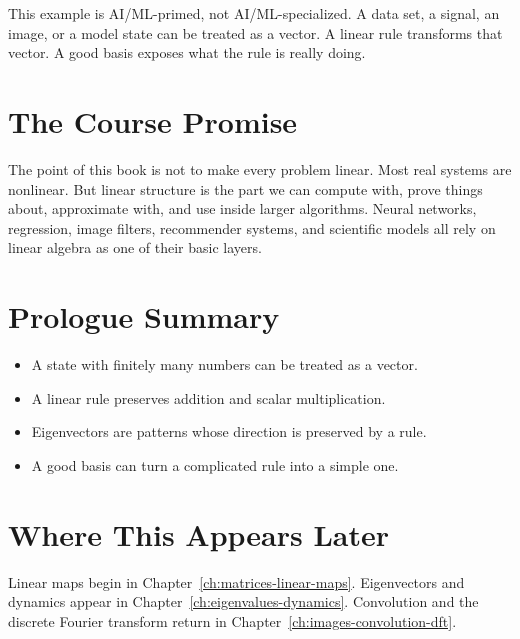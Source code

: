 \begin{aimlbox}
This example is AI/ML-primed, not AI/ML-specialized. A data set, a signal, an
image, or a model state can be treated as a vector. A linear rule transforms
that vector. A good basis exposes what the rule is really doing.
\end{aimlbox}

\section*{The Course Promise}

The point of this book is not to make every problem linear. Most real systems
are nonlinear. But linear structure is the part we can compute with, prove
things about, approximate with, and use inside larger algorithms. Neural
networks, regression, image filters, recommender systems, and scientific
models all rely on linear algebra as one of their basic layers.

\section*{Prologue Summary}

\begin{itemize}
  \item A state with finitely many numbers can be treated as a vector.
  \item A linear rule preserves addition and scalar multiplication.
  \item Eigenvectors are patterns whose direction is preserved by a rule.
  \item A good basis can turn a complicated rule into a simple one.
\end{itemize}

\section*{Where This Appears Later}

Linear maps begin in Chapter~\ref{ch:matrices-linear-maps}. Eigenvectors and
dynamics appear in Chapter~\ref{ch:eigenvalues-dynamics}. Convolution and the
discrete Fourier transform return in Chapter~\ref{ch:images-convolution-dft}.


